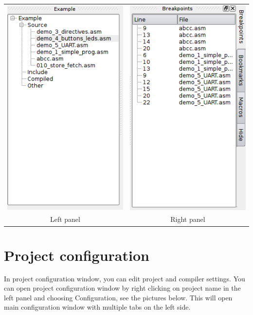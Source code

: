         \begin{table}[h!]
            \begin{tabular}{cc}
                \includegraphics[width=.33\textwidth]{img/left_panel.png}
                    &
                \includegraphics[width=.33\textwidth]{img/right_panel.png}
                    \\
                Left panel & Right panel
            \end{tabular}
        \end{table}

\clearpage

\section{Project configuration}
    In project configuration window, you can edit project and compiler settings. You can open project configuration
    window by right clicking on project name in the left panel and choosing Configuration, see the pictures below.
    This will open main configuration window with multiple tabs on the left side.

